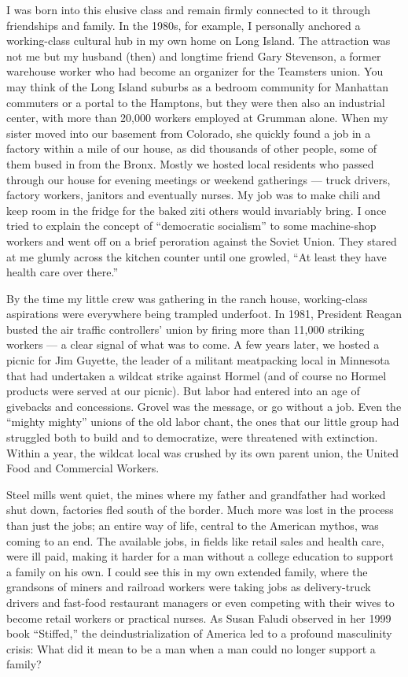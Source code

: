 I was born into this elusive class and remain firmly connected to it
through friendships and family. In the 1980s, for example, I personally
anchored a working-class cultural hub in my own home on Long Island. The
attraction was not me but my husband (then) and longtime friend Gary
Stevenson, a former warehouse worker who had become an organizer for the
Teamsters union. You may think of the Long Island suburbs as a bedroom
community for Manhattan commuters or a portal to the Hamptons, but they
were then also an industrial center, with more than 20,000 workers
employed at Grumman alone. When my sister moved into our basement from
Colorado, she quickly found a job in a factory within a mile of our
house, as did thousands of other people, some of them bused in from the
Bronx. Mostly we hosted local residents who passed through our house for
evening meetings or weekend gatherings --- truck drivers, factory
workers, janitors and eventually nurses. My job was to make chili and
keep room in the fridge for the baked ziti others would invariably
bring. I once tried to explain the concept of ``democratic socialism''
to some machine-shop workers and went off on a brief peroration against
the Soviet Union. They stared at me glumly across the kitchen counter
until one growled, ``At least they have health care over there.''

By the time my little crew was gathering in the ranch house,
working-class aspirations were everywhere being trampled underfoot. In
1981, President Reagan busted the air traffic controllers' union by
firing more than 11,000 striking workers --- a clear signal of what was
to come. A few years later, we hosted a picnic for Jim Guyette, the
leader of a militant meatpacking local in Minnesota that had undertaken
a wildcat strike against Hormel (and of course no Hormel products were
served at our picnic). But labor had entered into an age of givebacks
and concessions. Grovel was the message, or go without a job. Even the
``mighty mighty'' unions of the old labor chant, the ones that our
little group had struggled both to build and to democratize, were
threatened with extinction. Within a year, the wildcat local was crushed
by its own parent union, the United Food and Commercial Workers.

Steel mills went quiet, the mines where my father and grandfather had
worked shut down, factories fled south of the border. Much more was lost
in the process than just the jobs; an entire way of life, central to the
American mythos, was coming to an end. The available jobs, in fields
like retail sales and health care, were ill paid, making it harder for a
man without a college education to support a family on his own. I could
see this in my own extended family, where the grandsons of miners and
railroad workers were taking jobs as delivery-truck drivers and
fast-food restaurant managers or even competing with their wives to
become retail workers or practical nurses. As Susan Faludi observed in
her 1999 book ``Stiffed,'' the deindustrialization of America led to a
profound masculinity crisis: What did it mean to be a man when a man
could no longer support a family?

